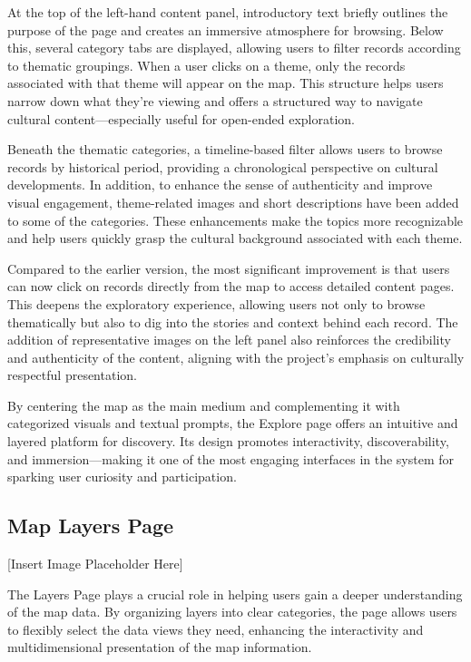 At the top of the left-hand content panel, introductory text briefly outlines the purpose of the page and creates an immersive atmosphere for browsing. Below this, several category tabs are displayed, allowing users to filter records according to thematic groupings. When a user clicks on a theme, only the records associated with that theme will appear on the map. This structure helps users narrow down what they're viewing and offers a structured way to navigate cultural content—especially useful for open-ended exploration.

Beneath the thematic categories, a timeline-based filter allows users to browse records by historical period, providing a chronological perspective on cultural developments. In addition, to enhance the sense of authenticity and improve visual engagement, theme-related images and short descriptions have been added to some of the categories. These enhancements make the topics more recognizable and help users quickly grasp the cultural background associated with each theme.

Compared to the earlier version, the most significant improvement is that users can now click on records directly from the map to access detailed content pages. This deepens the exploratory experience, allowing users not only to browse thematically but also to dig into the stories and context behind each record. The addition of representative images on the left panel also reinforces the credibility and authenticity of the content, aligning with the project’s emphasis on culturally respectful presentation.

By centering the map as the main medium and complementing it with categorized visuals and textual prompts, the Explore page offers an intuitive and layered platform for discovery. Its design promotes interactivity, discoverability, and immersion—making it one of the most engaging interfaces in the system for sparking user curiosity and participation.

\subsection{Map Layers Page}
[Insert Image Placeholder Here]

The Layers Page plays a crucial role in helping users gain a deeper understanding of the map data. By organizing layers into clear categories, the page allows users to flexibly select the data views they need, enhancing the interactivity and multidimensional presentation of the map information.

